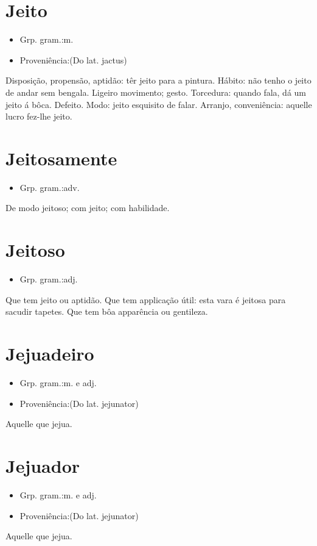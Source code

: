 \documentclass{article}
\begin{document}
\section{Jeito}
\begin{itemize}
\item {Grp. gram.:m.}
\end{itemize}
\begin{itemize}
\item {Proveniência:(Do lat. \textunderscore jactus\textunderscore )}
\end{itemize}
Disposição, propensão, aptidão: \textunderscore têr jeito para a pintura\textunderscore .
Hábito: \textunderscore não tenho o jeito de andar sem bengala\textunderscore .
Ligeiro movimento; gesto.
Torcedura: \textunderscore quando fala, dá um jeito á bôca\textunderscore .
Defeito.
Modo: \textunderscore jeito esquisito de falar\textunderscore .
Arranjo, conveniência: \textunderscore aquelle lucro fez-lhe jeito\textunderscore .
\section{Jeitosamente}
\begin{itemize}
\item {Grp. gram.:adv.}
\end{itemize}
De modo jeitoso; com jeito; com habilidade.
\section{Jeitoso}
\begin{itemize}
\item {Grp. gram.:adj.}
\end{itemize}
Que tem jeito ou aptidão.
Que tem applicação útil: \textunderscore esta vara é jeitosa para sacudir tapetes\textunderscore .
Que tem bôa apparência ou gentileza.
\section{Jejuadeiro}
\begin{itemize}
\item {Grp. gram.:m.  e  adj.}
\end{itemize}
\begin{itemize}
\item {Proveniência:(Do lat. \textunderscore jejunator\textunderscore )}
\end{itemize}
Aquelle que jejua.
\section{Jejuador}
\begin{itemize}
\item {Grp. gram.:m.  e  adj.}
\end{itemize}
\begin{itemize}
\item {Proveniência:(Do lat. \textunderscore jejunator\textunderscore )}
\end{itemize}
Aquelle que jejua.
\end{document}
